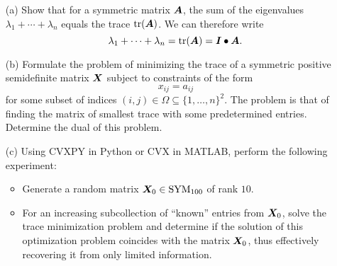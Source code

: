\documentclass{article}
\begin{document}
\begin{itemize}
 \item[(a)] Show that for a symmetric matrix $\bm{A}$, the sum of the eigenvalues $\lambda_1+\cdots+\lambda_n$ equals the trace $\mathrm{tr}(\bm{A})$. We can therefore write
 \begin{equation*}
  \lambda_1+\cdots+\lambda_n = \mathrm{tr}(\bm{A}) = \bm{I}\bullet \bm{A}.
 \end{equation*}
\item[(b)] Formulate the problem of minimizing the trace of a symmetric positive semidefinite matrix $\bm{X}$ subject to constraints of the form
\begin{equation*}
 x_{ij} = a_{ij}
\end{equation*}
for some subset of indices $(i,j)\in \Omega \subseteq \{1,\dots,n\}^2$. The problem is that of finding the matrix of smallest trace with some predetermined entries. Determine the dual of this problem.
\item[(c)] Using CVXPY in Python or CVX in MATLAB, perform the following experiment:
\begin{itemize}
\item Generate a random matrix $\bm{X}_0\in \mathrm{SYM}_{100}$ of rank $10$. 
\item For an increasing subcollection of ``known'' entries from $\bm{X}_0$, solve the trace minimization problem and determine if the solution of this optimization problem coincides with the matrix $\bm{X}_0$, thus effectively recovering it from only limited information.
\end{itemize}
\end{itemize}
\end{document}
